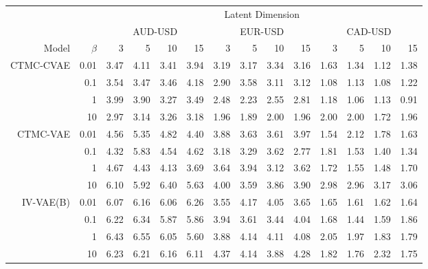 \documentclass[onefignum,onetabnum]{siamonline190516}
\begin{document}
\begin{table}[t!]
\renewcommand{\arraystretch}{1}
\centering

\scriptsize
\begin{tabular}{rrrrrrrrrrrrrr}
 \toprule
 &  & \multicolumn{12}{c}{Latent Dimension}\\
\cmidrule(lr){3-14}
 &  & \multicolumn{4}{c}{AUD-USD} & \multicolumn{4}{c}{EUR-USD} & \multicolumn{4}{c}{CAD-USD} \\
 \cmidrule(lr){3-6}\cmidrule(lr){7-10}\cmidrule(lr){11-14}
 Model & $\beta$ & 3 & 5 & 10 & 15 & 3 & 5 & 10 & 15 & 3 & 5 & 10 & 15\\
 \midrule
 \multirow{4}{*}{CTMC-CVAE}
 &  0.01 & 3.47 & 4.11 & 3.41 & 3.94 & 3.19 & 3.17 & 3.34 & 3.16 & 1.63 & 1.34 & 1.12 & 1.38\\
 &  0.1  & 3.54 & 3.47 & 3.46 & 4.18 & 2.90 & 3.58 & 3.11 & 3.12 & 1.08 & 1.13 & 1.08 & 1.22\\
 &  1    & 3.99 & 3.90 & 3.27 & 3.49 & 2.48 & 2.23 & 2.55 & 2.81 & 1.18 & 1.06 & 1.13 & 0.91\\
 &  10   & 2.97 & 3.14 & 3.26 & 3.18 & 1.96 & 1.89 & 2.00 & 1.96 & 2.00 & 2.00 & 1.72 & 1.96\\
 
  \midrule
 \multirow{4}{*}{CTMC-VAE}
 &  0.01 & 4.56 & 5.35 & 4.82 & 4.40 & 3.88 & 3.63 & 3.61 & 3.97 & 1.54 & 2.12 & 1.78 & 1.63\\
 &  0.1  & 4.32 & 5.83 & 4.54 & 4.62 & 3.18 & 3.29 & 3.62 & 2.77 & 1.81 & 1.53 & 1.40 & 1.34\\
 &  1    & 4.67 & 4.43 & 4.13 & 3.69 & 3.64 & 3.94 & 3.12 & 3.62 & 1.72 & 1.55 & 1.48 & 1.70\\
 &  10   & 6.10 & 5.92 & 6.40 & 5.63 & 4.00 & 3.59 & 3.86 & 3.90 & 2.98 & 2.96 & 3.17 & 3.06\\
 
  \midrule
 \multirow{4}{*}{IV-VAE(B)}
 &  0.01 & 6.07 & 6.16 & 6.06 & 6.26 & 3.55 & 4.17 & 4.05 & 3.65 & 1.65 & 1.61 & 1.62 & 1.64\\
 &  0.1  & 6.22 & 6.34 & 5.87 & 5.86 & 3.94 & 3.61 & 3.44 & 4.04 & 1.68 & 1.44 & 1.59 & 1.86\\
 &  1    & 6.43 & 6.55 & 6.05 & 5.60 & 3.88 & 4.14 & 4.11 & 4.08 & 2.05 & 1.97 & 1.83 & 1.79\\
 &  10   & 6.23 & 6.21 & 6.16 & 6.11 & 4.37 & 4.14 & 3.88 & 4.28 & 1.82 & 1.76 & 2.32 & 1.75\\
 

\end{tabular}
\end{table}
\end{document}
